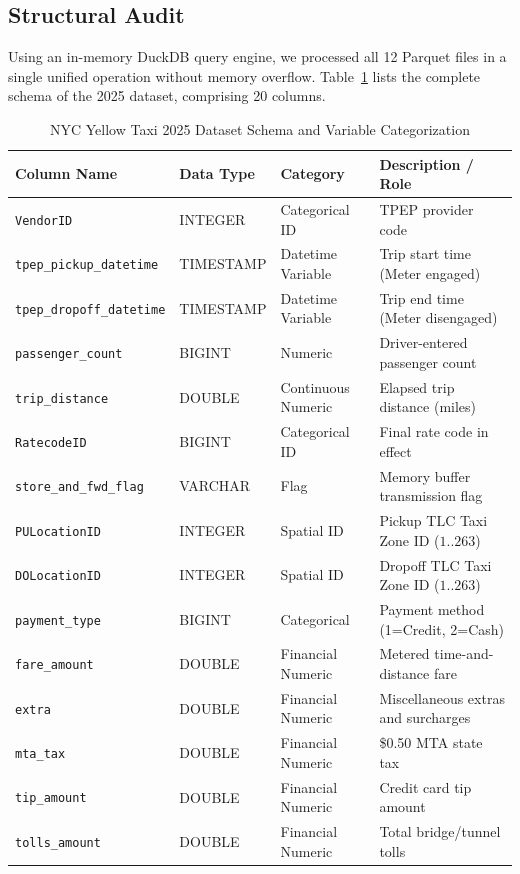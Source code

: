\documentclass[11pt,a4paper]{article}
\begin{document}
\subsection{Structural Audit}
Using an in-memory DuckDB query engine, we processed all 12 Parquet files in a single unified operation without memory overflow. Table~\ref{tab:schema} lists the complete schema of the 2025 dataset, comprising 20 columns.

\begin{table}[htbp]
\centering
\caption{NYC Yellow Taxi 2025 Dataset Schema and Variable Categorization}
\label{tab:schema}
\small
\begin{tabularx}{\textwidth}{llXX}
\toprule
\textbf{Column Name} & \textbf{Data Type} & \textbf{Category} & \textbf{Description / Role} \\
\midrule
\texttt{VendorID} & INTEGER & Categorical ID & TPEP provider code \\
\texttt{tpep\_pickup\_datetime} & TIMESTAMP & Datetime Variable & Trip start time (Meter engaged) \\
\texttt{tpep\_dropoff\_datetime} & TIMESTAMP & Datetime Variable & Trip end time (Meter disengaged) \\
\texttt{passenger\_count} & BIGINT & Numeric & Driver-entered passenger count \\
\texttt{trip\_distance} & DOUBLE & Continuous Numeric & Elapsed trip distance (miles) \\
\texttt{RatecodeID} & BIGINT & Categorical ID & Final rate code in effect \\
\texttt{store\_and\_fwd\_flag} & VARCHAR & Flag & Memory buffer transmission flag \\
\texttt{PULocationID} & INTEGER & Spatial ID & Pickup TLC Taxi Zone ID ($1..263$) \\
\texttt{DOLocationID} & INTEGER & Spatial ID & Dropoff TLC Taxi Zone ID ($1..263$) \\
\texttt{payment\_type} & BIGINT & Categorical & Payment method (1=Credit, 2=Cash) \\
\texttt{fare\_amount} & DOUBLE & Financial Numeric & Metered time-and-distance fare \\
\texttt{extra} & DOUBLE & Financial Numeric & Miscellaneous extras and surcharges \\
\texttt{mta\_tax} & DOUBLE & Financial Numeric & \$0.50 MTA state tax \\
\texttt{tip\_amount} & DOUBLE & Financial Numeric & Credit card tip amount \\
\texttt{tolls\_amount} & DOUBLE & Financial Numeric & Total bridge/tunnel tolls \\

\end{tabularx}
\end{table}
\end{document}
